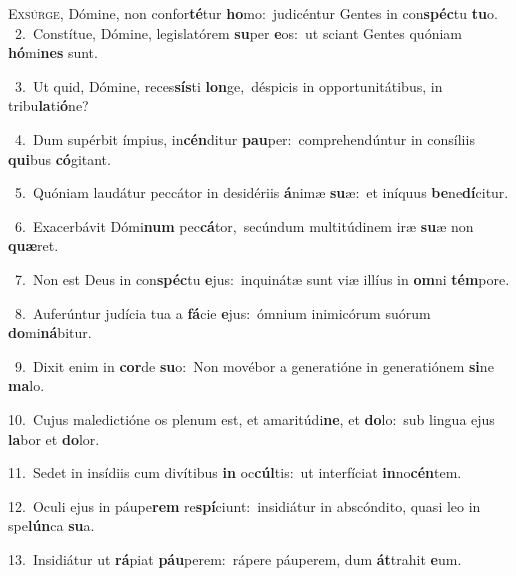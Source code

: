 \lettrine{\initial\textcolor{\initialcolor}{E}}{xsúrge,} Dómine, non confor\-\textbf{té}\-tur \textbf{ho}\-mo:~\star judicéntur Gentes in con\-\textbf{spéc}\-tu \textbf{tu}\-o.\\
{\numbfont\textcolor{\numbcolor}{~2.}}~Constítue, Dómine, legislatórem \textbf{su}\-per \textbf{e}\-os:~\star ut sciant Gentes quóniam \textbf{hó}\-mi\textbf{nes} sunt.\par
{\numbfont\textcolor{\numbcolor}{~3.}}~Ut quid, Dómine, reces\-\textbf{sís}\-ti \textbf{lon}\-ge,~\star déspicis in opportunitátibus, in tribu\-\textbf{la}\-ti\-\textbf{ó}\-ne?\par
{\numbfont\textcolor{\numbcolor}{~4.}}~Dum supérbit ímpius, in\-\textbf{cén}\-ditur \textbf{pau}\-per:~\star comprehendúntur in consíliis \textbf{qui}\-bus \textbf{có}\-gitant.\par
{\numbfont\textcolor{\numbcolor}{~5.}}~Quóniam laudátur peccátor in desidériis \textbf{á}\-nimæ \textbf{su}\-æ:~\star et iníquus \textbf{be}\-ne\-\textbf{dí}\-citur.\par
{\numbfont\textcolor{\numbcolor}{~6.}}~Exacerbávit Dómi\textbf{num} pec\-\textbf{cá}\-tor,~\star secúndum multitúdinem iræ \textbf{su}\-æ non \textbf{quæ}\-ret.\par
{\numbfont\textcolor{\numbcolor}{~7.}}~Non est Deus in con\-\textbf{spéc}\-tu \textbf{e}\-jus:~\star inquinátæ sunt viæ illíus in \textbf{om}\-ni \textbf{tém}\-pore.\par
{\numbfont\textcolor{\numbcolor}{~8.}}~Auferúntur judícia tua a \textbf{fá}\-cie \textbf{e}\-jus:~\star ómnium inimicórum suórum \textbf{do}\-mi\-\textbf{ná}\-bitur.\par
{\numbfont\textcolor{\numbcolor}{~9.}}~Dixit enim in \textbf{cor}\-de \textbf{su}\-o:~\star Non movébor a generatióne in generatiónem \textbf{si}\-ne \textbf{ma}\-lo.\par
{\numbfont\textcolor{\numbcolor}{10.}}~Cujus maledictióne os plenum est, et amaritúdi\-\textbf{ne}\-, et \textbf{do}\-lo:~\star sub lingua ejus \textbf{la}\-bor et \textbf{do}\-lor.\par
{\numbfont\textcolor{\numbcolor}{11.}}~Sedet in insídiis cum divítibus \textbf{in} oc\-\textbf{cúl}\-tis:~\star ut interfíciat \textbf{in}\-no\-\textbf{cén}\-tem.\par
{\numbfont\textcolor{\numbcolor}{12.}}~Oculi ejus in páupe\textbf{rem} re\-\textbf{spí}\-ciunt:~\star insidiátur in abscóndito, quasi leo in spe\-\textbf{lún}\-ca \textbf{su}\-a.\par
{\numbfont\textcolor{\numbcolor}{13.}}~Insidiátur ut \textbf{rá}\-piat \textbf{páu}\-perem:~\star rápere páuperem, dum \textbf{át}\-trahit \textbf{e}\-um.\par
